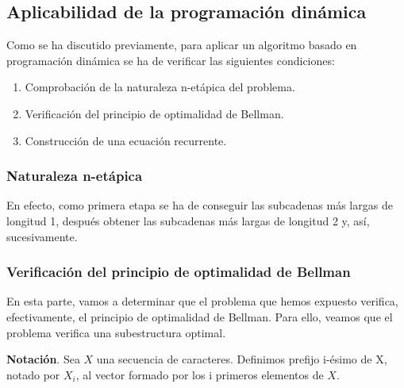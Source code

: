 
\subsection{Aplicabilidad de la programación dinámica}

Como se ha discutido previamente, para aplicar un algoritmo basado en programación
dinámica se ha de verificar las siguientes condiciones:

\begin{enumerate}
    \item Comprobación de la naturaleza n-etápica del problema. 
    \item Verificación del principio de optimalidad de Bellman. 
    \item Construcción de una ecuación recurrente. 
\end{enumerate}

\subsubsection{Naturaleza n-etápica}
En efecto, 
como primera etapa se ha de conseguir las subcadenas más largas de longitud 1, 
después obtener las subcadenas más largas de longitud 2 y, así, sucesivamente. 


\subsubsection{Verificación del principio de optimalidad de Bellman}

En esta parte, vamos a determinar que el problema que hemos expuesto verifica,
efectivamente, el principio de optimalidad de Bellman. Para ello, veamos que el
problema verifica una subestructura optimal.

\textbf{Notación}. Sea $X$ una secuencia de caracteres. Definimos prefijo i-ésimo
de X, notado por $X_i$, al vector formado por los i primeros elementos de $X$. 

\begin{theorem}
    
\end{theorem}